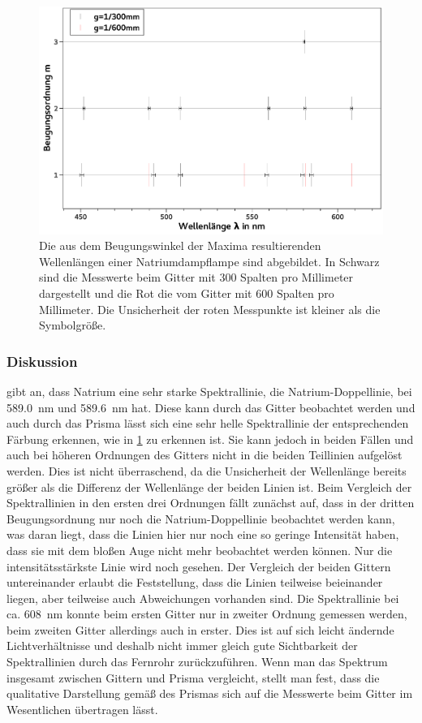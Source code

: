 \documentclass[
	a4paper,
	12pt,
	pagesize,
	ngerman
]{scrartcl}
\begin{document}
	\begin{figure}[H] 
		\includegraphics[width=1\textwidth]{fig_natrium}
		\centering
		\caption{Die aus dem Beugungswinkel der Maxima resultierenden Wellenlängen einer Natriumdampflampe sind abgebildet.
		In Schwarz sind die Messwerte beim Gitter mit 300 Spalten pro Millimeter dargestellt und die Rot die vom Gitter mit 600 Spalten pro Millimeter.
		Die Unsicherheit der roten Messpunkte ist kleiner als die Symbolgröße.
		}
		\label{fig_natrium}
		\centering
	\end{figure}

	\subsubsection{Diskussion}
	
	\cite{NatriumDoppel} gibt an, dass Natrium eine sehr starke Spektrallinie, die Natrium-Doppellinie, bei \SI{589,0}{\nano \meter} und \SI{589,6}{\nano \meter} hat.
	Diese kann durch das Gitter beobachtet werden und auch durch das Prisma lässt sich eine sehr helle Spektrallinie der entsprechenden Färbung erkennen, wie in \cref{fig_natrium} zu erkennen ist.
	Sie kann jedoch in beiden Fällen und auch bei höheren Ordnungen des Gitters nicht in die beiden Teillinien aufgelöst werden.
	Dies ist nicht überraschend, da die Unsicherheit der Wellenlänge bereits größer als die Differenz der Wellenlänge der beiden Linien ist.
	Beim Vergleich der Spektrallinien in den ersten drei Ordnungen fällt zunächst auf, dass in der dritten Beugungsordnung nur noch die Natrium-Doppellinie beobachtet werden kann, was daran liegt, dass die Linien hier nur noch eine so geringe Intensität haben, dass sie mit dem bloßen Auge nicht mehr beobachtet werden können.
	Nur die intensitätsstärkste Linie wird noch gesehen.
	Der Vergleich der beiden Gittern untereinander erlaubt die Feststellung, dass die Linien teilweise beieinander liegen, aber teilweise auch Abweichungen vorhanden sind.
	Die Spektrallinie bei ca. \SI{608}{\nano \meter} konnte beim ersten Gitter nur in zweiter Ordnung gemessen werden, beim zweiten Gitter allerdings auch in erster.
	Dies ist auf sich leicht ändernde Lichtverhältnisse und deshalb nicht immer gleich gute Sichtbarkeit der Spektrallinien durch das Fernrohr zurückzuführen.
	Wenn man das Spektrum insgesamt zwischen Gittern und Prisma vergleicht, stellt man fest, dass die qualitative Darstellung gemäß des Prismas sich auf die Messwerte beim Gitter im Wesentlichen übertragen lässt.
	
\end{document}
